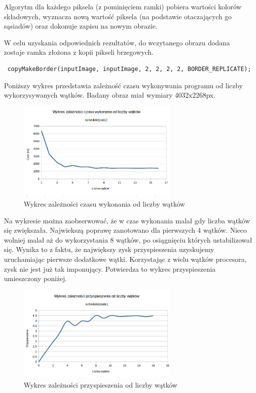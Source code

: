 \documentclass[a4paper,12pt]{article}
\begin{document}
Algorytm dla każdego piksela (z pominięciem ramki) pobiera wartości kolorów składowych, wyznacza nową wartość piksela (na podstawie otaczających go sąsiadów) oraz dokonuje zapisu na nowym obrazie. \newline

\noindent W celu uzyskania odpowiednich rezultatów, do wczytanego obrazu dodana zostaje ramka złożona z kopii pikseli brzegowych. 

\begin{lstlisting}
 copyMakeBorder(inputImage, inputImage, 2, 2, 2, 2, BORDER_REPLICATE);
\end{lstlisting}

\newpage

\noindent Poniższy wykres przedstawia zależność czasu wykonywania programu od liczby wykorzysywanych wątków. Badany obraz miał wymiary 4032x2268px.

\begin{figure}[!ht]
	\centering
 \includegraphics[width=0.7\textwidth]{./dane/wykres1_s.png}
  \caption{Wykres zależności czasu wykonania od liczby wątków}
\end{figure}

Na wykresie można zaobserwować, że w czas wykonania malał gdy liczba wątków się zwiększała. Najwiekszą poprawę zanotowano dla pierwszych 4 wątków. Nieco wolniej malał aż do wykorzystania 8 wątków, po osiągnięciu których ustabilizował się. Wynika to z faktu, że największy zysk przyspieszenia uzyskujemy uruchamiając pierwsze dodatkowe wątki. Korzystając z wielu wątków procesora, zysk nie jest już tak imponujący. Potwierdza to wykres przyspieszenia umieszczony poniżej.

\begin{figure}[ht]
	\centering
  \includegraphics[width=0.7\textwidth]{./dane/wykres2_s.png}
  \caption{Wykres zależności przyspieszenia od liczby wątków}
\end{figure}
\end{document}
